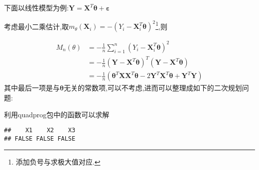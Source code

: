\documentclass[]{ctexbook}
\newenvironment{Shaded}{\begin{snugshade}}{\end{snugshade}}
\newcommand{\DataTypeTok}[1]{\textcolor[rgb]{0.13,0.29,0.53}{#1}}
\newcommand{\DecValTok}[1]{\textcolor[rgb]{0.00,0.00,0.81}{#1}}
\newcommand{\KeywordTok}[1]{\textcolor[rgb]{0.13,0.29,0.53}{\textbf{#1}}}
\newcommand{\NormalTok}[1]{#1}
\newcommand{\OperatorTok}[1]{\textcolor[rgb]{0.81,0.36,0.00}{\textbf{#1}}}
\newcommand{\StringTok}[1]{\textcolor[rgb]{0.31,0.60,0.02}{#1}}
\begin{document}
下面以线性模型为例:\(\boldsymbol{Y}=\boldsymbol{X}^{T}\boldsymbol{\theta}+\boldsymbol{\varepsilon}\)

考虑最小二乘估计,取\(m_{\theta}\left(\boldsymbol{X}_{i}\right)=-\left(Y_{i}-\boldsymbol{X}_{i}^{T} \boldsymbol{\theta}\right)^{2}\)\footnote{添加负号与求极大值对应.},则

\[ 
\begin{aligned} 
M_{n}(\theta)&=-\frac{1}{n} \sum_{i=1}^{n}\left(Y_{i}-\boldsymbol{X}_{i}^{T} \boldsymbol{\theta}\right)^{2}\\
&=-\frac{1}{n}\left(\boldsymbol{Y}-\boldsymbol{X}^{T} \boldsymbol{\theta}\right)^{T}\left(\boldsymbol{Y}-\boldsymbol{X}^{T} \boldsymbol{\theta}\right)\\
&=-\frac{1}{n}\left(\boldsymbol{\theta}^{T} \boldsymbol{X} \boldsymbol{X}^{T} \boldsymbol{\theta}-2 \boldsymbol{Y}^{T} \boldsymbol{X}^{T} \boldsymbol{\theta}+\boldsymbol{Y}^{T} \boldsymbol{Y}\right)
\end{aligned} 
\]
其中最后一项是与\(\boldsymbol{\theta}\)无关的常数项,可以不考虑,进而可以整理成如下的二次规划问题:

利用quadprog包中的函数可以求解

\begin{Shaded}
\end{Shaded}

\begin{verbatim}
##    X1    X2    X3 
## FALSE FALSE FALSE
\end{verbatim}
\end{document}
